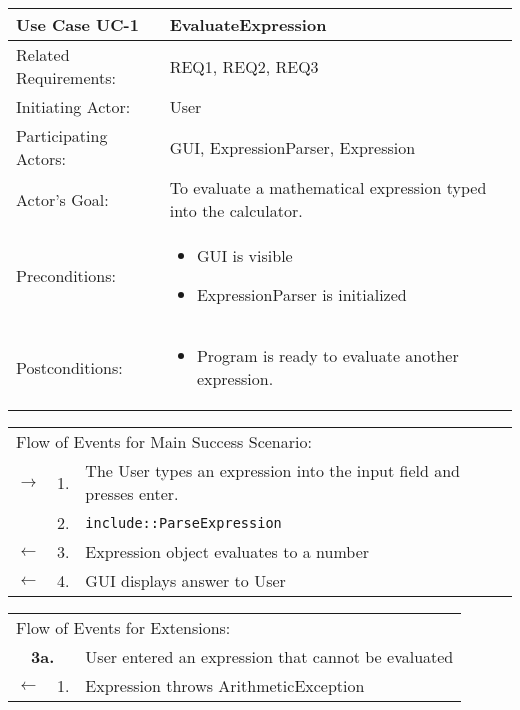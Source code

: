 \documentclass[11pt]{article}
\newcommand{\code}[1]{\texttt{#1}}
\begin{document}
\begin{center}
\begin{tabular}{p{1.5in}p{5in}}
\hline
\textbf{Use Case UC-1}     & \textbf{EvaluateExpression} \\ \hline
Related Requirements: & REQ1, REQ2, REQ3 \\
Initiating Actor:     & User \\
Participating Actors: & GUI, ExpressionParser, Expression \\
Actor's Goal:          & To evaluate a mathematical expression typed into the calculator. \\
Preconditions:         & \begin{itemize}[nosep]
                         \item GUI is visible
                         \item ExpressionParser is initialized
                         \end{itemize} \\
Postconditions:        & \begin{itemize}[nosep]
                         \item Program is ready to evaluate another expression.
                         \end{itemize} \\ \hline
\end{tabular}

\begin{tabular}{p{.25in}p{.25in}p{5.8in}}
\multicolumn{3}{l}{Flow of Events for Main Success Scenario:} \\
$\rightarrow$ & 1. & The User types an expression into the input field and presses enter. \\
            & 2. & \code{include::ParseExpression} \\ 
$\leftarrow$  & 3. & Expression object evaluates to a number \\
$\leftarrow$  & 4. & GUI displays answer to User \\
\end{tabular}

\begin{tabular}{p{.25in}p{.25in}p{5.8in}}
\multicolumn{3}{l}{Flow of Events for Extensions:} \\
\multicolumn{2}{c}{\textbf{3a.}} & User entered an expression that cannot be evaluated \\
$\leftarrow$  & 1.           & Expression throws ArithmeticException
\end{tabular}
\end{center}
\end{document}
